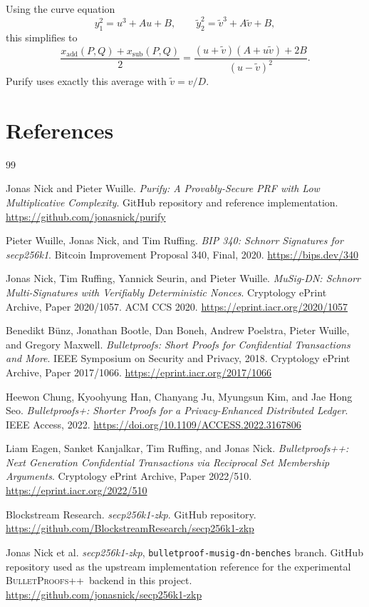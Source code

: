 \documentclass[11pt]{article}
\DeclareRobustCommand{\bppp}{{\normalfont\scshape BulletProofs++}}
\begin{document}
Using the curve equation
\[
y_1^2 = u^3 + Au + B, \qquad \tilde{y}_2^2 = \tilde{v}^3 + A\tilde{v} + B,
\]
this simplifies to
\[
\frac{x_{\mathrm{add}}(P,Q) + x_{\mathrm{sub}}(P,Q)}{2}
=
\frac{(u + \tilde{v})(A + u\tilde{v}) + 2B}{(u - \tilde{v})^2}.
\]
Purify uses exactly this average with $\tilde{v} = v / D$.

\section*{References}

\begin{thebibliography}{99}

Jonas Nick and Pieter Wuille.
\newblock \emph{Purify: A Provably-Secure PRF with Low Multiplicative Complexity}.
\newblock GitHub repository and reference implementation.
\newblock \url{https://github.com/jonasnick/purify}

Pieter Wuille, Jonas Nick, and Tim Ruffing.
\newblock \emph{BIP 340: Schnorr Signatures for secp256k1}.
\newblock Bitcoin Improvement Proposal 340, Final, 2020.
\newblock \url{https://bips.dev/340}

Jonas Nick, Tim Ruffing, Yannick Seurin, and Pieter Wuille.
\newblock \emph{MuSig-DN: Schnorr Multi-Signatures with Verifiably Deterministic Nonces}.
\newblock Cryptology ePrint Archive, Paper 2020/1057.
\newblock ACM CCS 2020.
\newblock \url{https://eprint.iacr.org/2020/1057}

Benedikt B{\"u}nz, Jonathan Bootle, Dan Boneh, Andrew Poelstra, Pieter Wuille, and Gregory Maxwell.
\newblock \emph{Bulletproofs: Short Proofs for Confidential Transactions and More}.
\newblock IEEE Symposium on Security and Privacy, 2018.
\newblock Cryptology ePrint Archive, Paper 2017/1066.
\newblock \url{https://eprint.iacr.org/2017/1066}

Heewon Chung, Kyoohyung Han, Chanyang Ju, Myungsun Kim, and Jae Hong Seo.
\newblock \emph{Bulletproofs+: Shorter Proofs for a Privacy-Enhanced Distributed Ledger}.
\newblock IEEE Access, 2022.
\newblock \url{https://doi.org/10.1109/ACCESS.2022.3167806}

Liam Eagen, Sanket Kanjalkar, Tim Ruffing, and Jonas Nick.
\newblock \emph{Bulletproofs++: Next Generation Confidential Transactions via Reciprocal Set Membership Arguments}.
\newblock Cryptology ePrint Archive, Paper 2022/510.
\newblock \url{https://eprint.iacr.org/2022/510}

Blockstream Research.
\newblock \emph{secp256k1-zkp}.
\newblock GitHub repository.
\newblock \url{https://github.com/BlockstreamResearch/secp256k1-zkp}

Jonas Nick et al.
\newblock \emph{secp256k1-zkp}, \texttt{bulletproof-musig-dn-benches} branch.
\newblock GitHub repository used as the upstream implementation reference for the experimental \bppp\ backend in this project.
\newblock \url{https://github.com/jonasnick/secp256k1-zkp}

\end{thebibliography}
\end{document}
